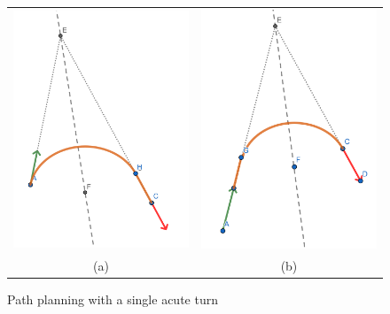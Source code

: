 \documentclass{article}
\begin{document}
\begin{figure}[hbt]  
  \begin{tabular}{cc}
    \includegraphics[width=6cm]{screenshots/single-acute-turn-rot-trans.png} &
    \includegraphics[width=6cm]{screenshots/single-acute-turn-trans-rot.png}\\
    (a) & (b)\\
  \end{tabular} 
  \caption{Path planning with a single acute turn}
  \label{fig:path1turnacute}
\end{figure}
\end{document}
